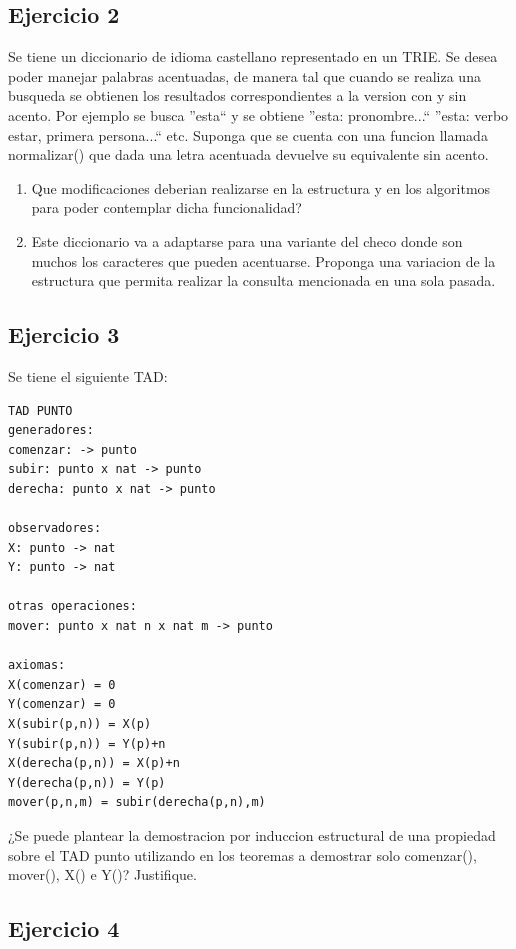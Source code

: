 \documentclass[10pt, a4paper]{report}
\begin{document}
\subsection*{Ejercicio 2}

Se tiene un diccionario de idioma castellano representado en un TRIE. Se desea poder manejar palabras acentuadas, de manera tal que cuando se realiza una busqueda se obtienen los resultados correspondientes a la version con y sin acento. Por ejemplo se busca ''esta`` y se obtiene ''esta: pronombre...`` ''esta: verbo estar, primera persona...`` etc. Suponga que se cuenta con una funcion llamada normalizar() que dada una letra acentuada devuelve su equivalente sin acento.

\begin{enumerate}
 \item Que modificaciones deberian realizarse en la estructura y en los algoritmos para poder contemplar dicha funcionalidad?
 \item Este diccionario va a adaptarse para una variante del checo donde son muchos los caracteres que pueden acentuarse. Proponga una variacion de la estructura que permita realizar la consulta mencionada en una sola pasada.
\end{enumerate}

\subsection*{Ejercicio 3}

Se tiene el siguiente TAD:

\begin{verbatim}
TAD PUNTO
generadores:
comenzar: -> punto
subir: punto x nat -> punto
derecha: punto x nat -> punto

observadores:
X: punto -> nat
Y: punto -> nat

otras operaciones:
mover: punto x nat n x nat m -> punto

axiomas:
X(comenzar) = 0
Y(comenzar) = 0
X(subir(p,n)) = X(p)
Y(subir(p,n)) = Y(p)+n
X(derecha(p,n)) = X(p)+n
Y(derecha(p,n)) = Y(p)
mover(p,n,m) = subir(derecha(p,n),m)
\end{verbatim}

¿Se puede plantear la demostracion por induccion estructural de una propiedad sobre el TAD punto utilizando en los teoremas a demostrar solo comenzar(), mover(), X() e Y()? Justifique.

\subsection*{Ejercicio 4}
\end{document}
